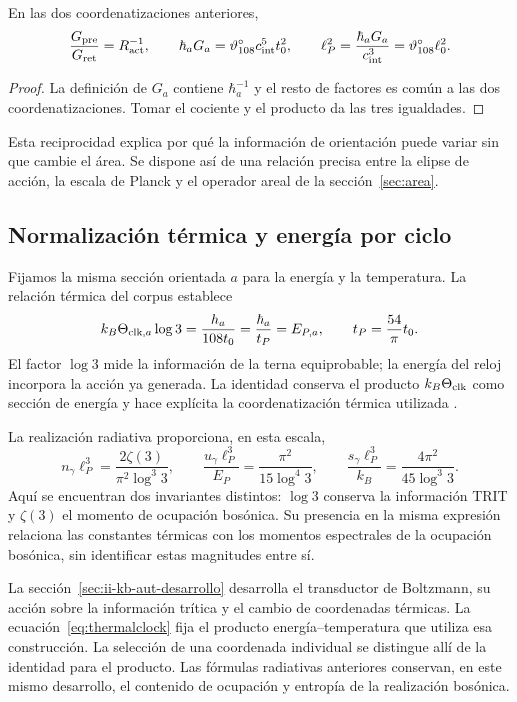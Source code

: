 \begin{proposition}
En las dos coordenatizaciones anteriores,
\[
\frac{G_{\rm pre}}{G_{\rm ret}}=R_{\rm act}^{-1},\qquad
\hbar_aG_a=\vartheta^\circ_{108}c_{\rm int}^5t_0^2,
\qquad
\ell_P^2=\frac{\hbar_aG_a}{c_{\rm int}^3}
=\vartheta^\circ_{108}\ell_0^2.
\]
\end{proposition}
\begin{proof}
La definición de $G_a$ contiene $\hbar_a^{-1}$ y el resto de factores
es común a las dos coordenatizaciones. Tomar el cociente y el producto da
las tres igualdades.
\end{proof}
Esta reciprocidad explica por qué la información de orientación puede
variar sin que cambie el área. Se dispone así de una relación precisa
entre la elipse de acción, la escala de Planck y el operador areal
de la sección~\ref{sec:area}.

\subsection{Normalización térmica y energía por ciclo}
Fijamos la misma sección orientada \(a\) para la energía y la
temperatura. La relación térmica del corpus establece
\begin{equation}
k_B\Theta_{{\rm clk},a}\log3
=\frac{h_a}{108t_0}
=\frac{\hbar_a}{t_P}=E_{P,a},
\qquad t_P=\frac{54}{\pi}t_0.
\label{eq:thermalclock}
\end{equation}
El factor $\log3$ mide la información de la terna equiprobable;
la energía del reloj incorpora la acción ya generada.
La identidad conserva el producto $k_B\Theta_{\rm clk}$ como sección
de energía y hace explícita la coordenatización térmica utilizada \cite{termica}.

La realización radiativa proporciona, en esta escala,
\[
n_\gamma\ell_P^3=\frac{2\zeta(3)}{\pi^2\log^3 3},\qquad
\frac{u_\gamma\ell_P^3}{E_P}
=\frac{\pi^2}{15\log^4 3},\qquad
\frac{s_\gamma\ell_P^3}{k_B}
=\frac{4\pi^2}{45\log^3 3}.
\]
Aquí se encuentran dos invariantes distintos: $\log3$ conserva la
información TRIT y $\zeta(3)$ el momento de ocupación bosónica.
Su presencia en la misma expresión relaciona las constantes térmicas
con los momentos espectrales de la ocupación bosónica, sin identificar
estas magnitudes entre sí.

La sección~\ref{sec:ii-kb-aut-desarrollo} desarrolla el transductor
de Boltzmann, su acción sobre la información trítica y el cambio de
coordenadas térmicas. La ecuación~\eqref{eq:thermalclock} fija el
producto energía--temperatura que utiliza esa construcción. La
selección de una coordenada individual se distingue allí de la
identidad para el producto. Las fórmulas radiativas anteriores
conservan, en este mismo desarrollo, el contenido de ocupación y
entropía de la realización bosónica.

